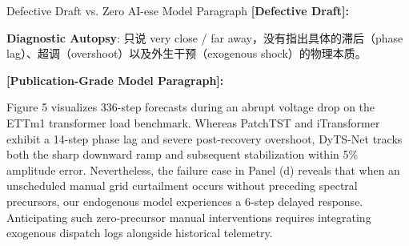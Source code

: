 \begin{ExampleBox}{Defective Draft vs. Zero AI-ese Model Paragraph}
\textbf{\color{TargetHighlight}[Defective Draft]:}\par
{}\par\vspace{4pt}
\textbf{Diagnostic Autopsy}: 只说 very close / far away，没有指出具体的滞后（phase lag）、超调（overshoot）以及外生干预（exogenous shock）的物理本质。\par\vspace{6pt}
\textbf{\color{AcadNavy}[Publication-Grade Model Paragraph]:}\par
Figure 5 visualizes 336-step forecasts during an abrupt voltage drop on the ETTm1 transformer load benchmark. Whereas PatchTST and iTransformer exhibit a 14-step phase lag and severe post-recovery overshoot, DyTS-Net tracks both the sharp downward ramp and subsequent stabilization within 5\% amplitude error. Nevertheless, the failure case in Panel (d) reveals that when an unscheduled manual grid curtailment occurs without preceding spectral precursors, our endogenous model experiences a 6-step delayed response. Anticipating such zero-precursor manual interventions requires integrating exogenous dispatch logs alongside historical telemetry.
\end{ExampleBox}
